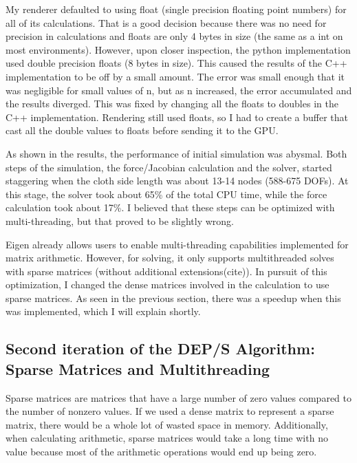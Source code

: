 \documentclass[letterpaper, 10 pt, conference]{ieeeconf}  %
\begin{document}
My renderer defaulted to using float (single precision floating point numbers) for all of its calculations. That is a good decision because there was no need for precision in calculations and floats are only 4 bytes in size (the same as a int on most environments). However, upon closer inspection, the python implementation used double precision floats (8 bytes in size). This caused the results of the C++ implementation to be off by a small amount. The error was small enough that it was negligible for small values of n, but as n increased, the error accumulated and the results diverged. This was fixed by changing all the floats to doubles in the C++ implementation. Rendering still used floats, so I had to create a buffer that cast all the double values to floats before sending it to the GPU.

As shown in the results, the performance of initial simulation was abysmal. Both steps of the simulation, the force/Jacobian calculation and the solver, started staggering when the cloth side length was about 13-14 nodes (588-675 DOFs). At this stage, the solver took about 65\% of the total CPU time, while the force calculation took about 17\%. I believed that these steps can be optimized with multi-threading, but that proved to be slightly wrong. 

Eigen already allows users to enable multi-threading capabilities implemented for matrix arithmetic. However, for solving, it only supports multithreaded solves with sparse matrices (without additional extensions(cite)). In pursuit of this optimization, I changed the dense matrices involved in the calculation to use sparse matrices. As seen in the previous section, there was a speedup when this was implemented, which I will explain shortly. 

\subsection{Second iteration of the DEP/S Algorithm: Sparse Matrices and Multithreading}
Sparse matrices are matrices that have a large number of zero values compared to the number of nonzero values. If we used a dense matrix to represent a sparse matrix, there would be a whole lot of wasted space in memory. Additionally, when calculating arithmetic, sparse matrices would take a long time with no value because most of the arithmetic operations would end up being zero. 
\end{document}
